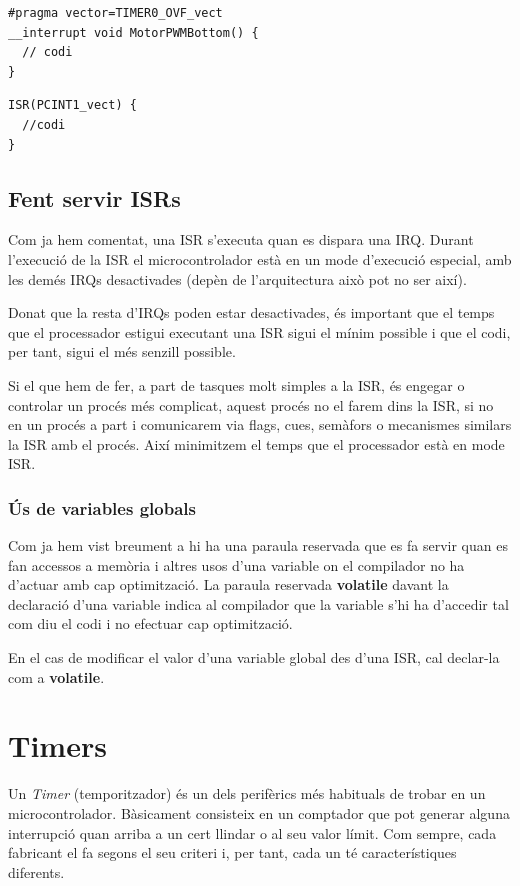 \begin{lstlisting}[style=customc, label=ISR_AVR_1, caption=Exemple d'ISR per AVR]
#pragma vector=TIMER0_OVF_vect
__interrupt void MotorPWMBottom() {
  // codi
}
\end{lstlisting}

\begin{lstlisting}[style=customc, label=ISR_AVR_2, caption=Exemple d'ISR per AVR]
ISR(PCINT1_vect) {
  //codi
}
\end{lstlisting}


\section{Fent servir ISRs}
Com ja hem comentat, una \gls{ISR} s'executa quan es dispara una \gls{IRQ}. Durant l'execució de la ISR el microcontrolador està en un mode d'execució especial, amb les demés IRQs desactivades (depèn de l'arquitectura això pot no ser així).

Donat que la resta d'IRQs poden estar desactivades, és important que el temps que el processador estigui executant una ISR sigui el mínim possible i que el codi, per tant, sigui el més senzill possible.

Si el que hem de fer, a part de tasques molt simples a la ISR, és engegar o controlar un procés més complicat, aquest procés no el farem dins la ISR, si no en un procés a part i comunicarem via \glspl{flag}, cues, semàfors o mecanismes similars la ISR amb el procés. Així minimitzem el temps que el processador està en mode ISR.

\subsection{Ús de variables globals}
\label{sb:volatile}
Com ja hem vist breument a  hi ha una paraula reservada que es fa servir quan es fan accessos a memòria i altres usos d'una variable on el compilador no ha d'actuar amb cap optimització. La paraula reservada {\bf volatile} davant la declaració d'una variable indica al compilador que la variable s'hi ha d'accedir tal com diu el codi i no efectuar cap optimització.

\begin{remark}
En el cas de modificar el valor d'una variable global des d'una ISR, cal declar-la com a {\bf volatile}.
\end{remark}

\chapter{Timers}
\label{sub:Timers}
Un {\em \gls{Timer}} (temporitzador) és un dels perifèrics més habituals de trobar en un microcontrolador. Bàsicament consisteix en un comptador que pot generar alguna interrupció quan arriba a un cert llindar o al seu valor límit. Com sempre, cada fabricant el fa segons el seu criteri i, per tant, cada un té característiques diferents.

